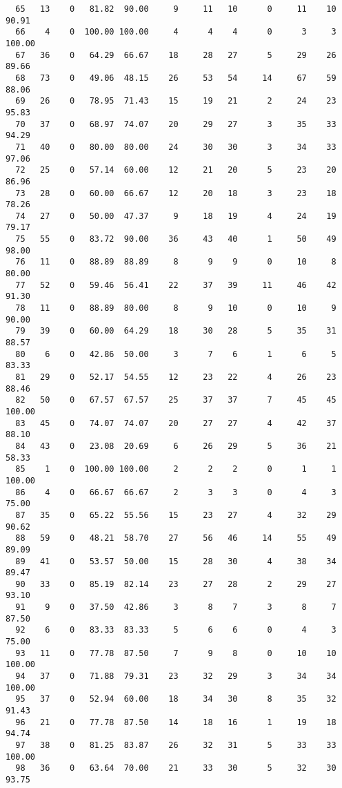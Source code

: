 \begin{verbatim}
  65   13    0   81.82  90.00     9     11   10      0     11    10    90.91
  66    4    0  100.00 100.00     4      4    4      0      3     3   100.00
  67   36    0   64.29  66.67    18     28   27      5     29    26    89.66
  68   73    0   49.06  48.15    26     53   54     14     67    59    88.06
  69   26    0   78.95  71.43    15     19   21      2     24    23    95.83
  70   37    0   68.97  74.07    20     29   27      3     35    33    94.29
  71   40    0   80.00  80.00    24     30   30      3     34    33    97.06
  72   25    0   57.14  60.00    12     21   20      5     23    20    86.96
  73   28    0   60.00  66.67    12     20   18      3     23    18    78.26
  74   27    0   50.00  47.37     9     18   19      4     24    19    79.17
  75   55    0   83.72  90.00    36     43   40      1     50    49    98.00
  76   11    0   88.89  88.89     8      9    9      0     10     8    80.00
  77   52    0   59.46  56.41    22     37   39     11     46    42    91.30
  78   11    0   88.89  80.00     8      9   10      0     10     9    90.00
  79   39    0   60.00  64.29    18     30   28      5     35    31    88.57
  80    6    0   42.86  50.00     3      7    6      1      6     5    83.33
  81   29    0   52.17  54.55    12     23   22      4     26    23    88.46
  82   50    0   67.57  67.57    25     37   37      7     45    45   100.00
  83   45    0   74.07  74.07    20     27   27      4     42    37    88.10
  84   43    0   23.08  20.69     6     26   29      5     36    21    58.33
  85    1    0  100.00 100.00     2      2    2      0      1     1   100.00
  86    4    0   66.67  66.67     2      3    3      0      4     3    75.00
  87   35    0   65.22  55.56    15     23   27      4     32    29    90.62
  88   59    0   48.21  58.70    27     56   46     14     55    49    89.09
  89   41    0   53.57  50.00    15     28   30      4     38    34    89.47
  90   33    0   85.19  82.14    23     27   28      2     29    27    93.10
  91    9    0   37.50  42.86     3      8    7      3      8     7    87.50
  92    6    0   83.33  83.33     5      6    6      0      4     3    75.00
  93   11    0   77.78  87.50     7      9    8      0     10    10   100.00
  94   37    0   71.88  79.31    23     32   29      3     34    34   100.00
  95   37    0   52.94  60.00    18     34   30      8     35    32    91.43
  96   21    0   77.78  87.50    14     18   16      1     19    18    94.74
  97   38    0   81.25  83.87    26     32   31      5     33    33   100.00
  98   36    0   63.64  70.00    21     33   30      5     32    30    93.75

\end{verbatim}
